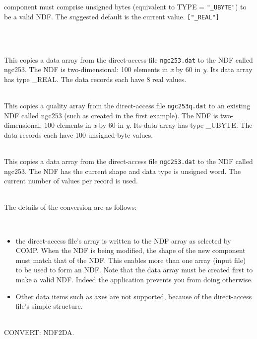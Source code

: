 \documentclass[twoside,11pt]{article}
\newcommand{\htmlref}[2]{#1}
\newcommand{\latex}[1]{#1}
\newcommand{\CONVERT}{{\footnotesize CONVERT}}
\newlength{\sstexampleslength}
\newcommand{\sstexamples}[1]{
   \goodbreak
   \item[Examples:] \mbox{} \\
   \vspace{-3.5ex}
   \begin{description}
      #1
   \end{description}
}
\newcommand{\sstexamplesubsection}[2]{\sloppy
\item[\parbox{\sstexampleslength}{\ssttt #1}] \mbox{} \vspace{0.5ex}
\\ #2 \vspace{1.0ex}}
\newcommand{\sstnotes}[1]{\pagebreak[3] \item[Notes:] \mbox{} \\[1.3ex] #1}
\newcommand{\sstdiytopic}[2]{\goodbreak \item[{\hspace{-0.35em}#1\hspace{-0.35em}:}] \mbox{} \\[1.3ex] #2}
\newcommand{\ssthitemlist}[1]{
  \latex{
  \mbox{} \\
  \vspace{-3.5ex}
  }
  \begin{itemize}
     #1
  \end{itemize}
}
\newcommand{\sstitem}{\item}
\newcommand{\sstexamples}[1]{
   \item[\vspace{0.35ex}\htmlref{Examples:\vspace{-0.5ex}}{app_example}]
      \begin{description}
         #1
      \end{description}
      \\
   }
\newcommand{\sstexamplesubsection}[2]{
   \vspace{-1.0ex} \item[{\ssttt #1}] #2 \vspace{0.2ex}}
\newcommand{\sstnotes}[1]{\item[Notes:]
      \begin{description}
         #1
      \end{description}
   }
\newcommand{\sstdiytopic}[2]{\\ \item[{#1}:]
      \begin{description}
         #2
      \end{description}
   }
\newcommand{\sstitem}{\item}
\begin{document}
{{{         component must comprise unsigned bytes (equivalent to TYPE =
         \texttt{"\_UBYTE"}) to be a valid NDF. The suggested default is the
         current value. \texttt{["\_REAL"]}
      }
   }
   \sstexamples{
      \sstexamplesubsection{
         da2ndf ngc253.dat ngc253 shape=[100,60] noperec=8
      }{
         This copies a data array from the direct-access file \texttt{ngc253.dat}
         to the NDF called ngc253.  The NDF is two-dimensional: 100
         elements in \textit{x} by 60 in \textit{y}.
         Its data array has type \_REAL.  
         The data records each have 8 real values.
      }
      \sstexamplesubsection{
         da2ndf ngc253q.dat ngc253 q 100 [100,60]
      }{
         This copies a quality array from the direct-access file
         \texttt{ngc253q.dat} to an existing NDF called ngc253 (such as created
         in the first example).  The NDF is two-dimensional: 100
         elements in \textit{x} by 60 in \textit{y}.  
         Its data array has type \_UBYTE.
         The data records each have 100 unsigned-byte values.
      }
      \sstexamplesubsection{
         da2ndf type="\_uword" in=ngc253.dat out=ngc253 $\backslash$
      }{
         This copies a data array from the direct-access file
         \texttt{ngc253.dat}
         to the NDF called ngc253.  The NDF has the current shape and
         data type is unsigned word.  The current number of values per
         record is used.
      }
   }
   \sstnotes{
      The details of the conversion are as follows:
      \ssthitemlist{

         \sstitem
            the direct-access file's array is written to the NDF array
            as selected by COMP.  When the NDF is being modified, the
            shape of the new component must match that of the NDF.  This
            enables more than one array (input file) to be used to form an
            NDF.  Note that the data array must be created first to make a
            valid NDF.  Indeed the application prevents you from doing
            otherwise.

         \sstitem
            Other data items such as axes are not supported, because of
            the direct-access file's simple structure.
      }
   }
   \sstdiytopic{
      Related Applications
   }{
      \CONVERT: \htmlref{NDF2DA}{NDF2DA}.
   }
}
\end{document}

